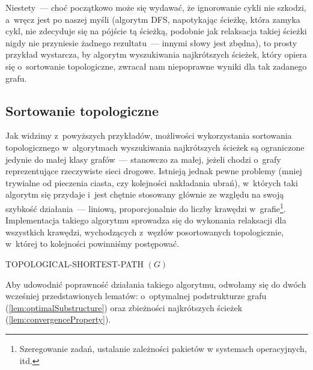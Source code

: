 Niestety~--- choć początkowo może się wydawać, że ignorowanie cykli nie szkodzi, a~wręcz jest po naszej myśli (algorytm \textsf{DFS}, napotykając ścieżkę, która zamyka cykl, nie zdecyduje się na pójście tą ścieżką, podobnie jak relaksacja takiej ścieżki nigdy nie przyniesie żadnego rezultatu~--- innymi słowy jest zbędna), to prosty przykład wystarcza, by algorytm wyszukiwania najkrótszych ścieżek, który opiera się o~sortowanie topologiczne, zwracał nam niepoprawne wyniki dla tak zadanego grafu.



\subsection{Sortowanie topologiczne}



Jak widzimy z~powyższych przykładów, możliwości wykorzystania sortowania topologicznego w~algorytmach wyszukiwania najkrótszych ścieżek są ograniczone jedynie do małej klasy grafów~--- stanowczo za małej, jeżeli chodzi o~grafy reprezentujące rzeczywiste sieci drogowe.
Istnieją jednak pewne problemy (mniej trywialne od pieczenia ciasta, czy kolejności nakładania ubrań), w~których taki algorytm się przydaje i~jest chętnie stosowany głównie ze względu na swoją szybkość działania~--- liniową, proporcjonalnie do liczby krawędzi w~grafie\footnote{
	Szeregowanie zadań, ustalanie zależności pakietów w systemach operacyjnych, itd.
}.
Implementacja takiego algorytmu sprowadza się do wykonania relaksacji dla wszystkich krawędzi, wychodzących z~węzłów posortowanych topologicznie, w~której to kolejności powinniśmy postępować.

\begin{pseudokod}[!htbp]
	\DontPrintSemicolon
	\caption{
		TOPOLOGICAL-SHORTEST-PATH $\left( G \right)$
	}
	\label{alg:topologicalShorestPath}
\end{pseudokod}

Aby udowodnić poprawność działania takiego algorytmu, odwołamy się do dwóch wcześniej przedstawionych lematów: o~optymalnej podstrukturze grafu (\ref{lem:optimalSubstructure}) oraz zbieżności najkrótszych ścieżek (\ref{lem:convergenceProperty}).

